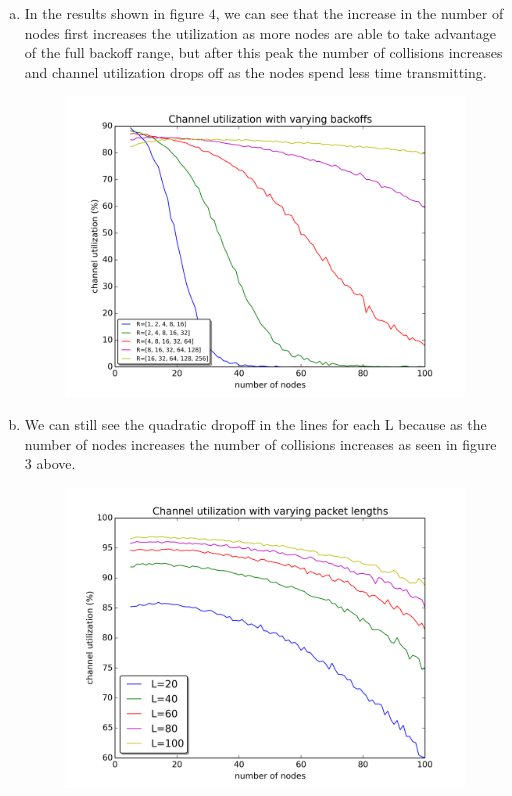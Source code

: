 \documentclass[11pt]{article}
\begin{document}
\begin{enumerate}[a.]
\newpage

\item In the results shown in figure $4$, we can see that the increase in the number of nodes first increases the utilization as more nodes are able to take advantage of the full backoff range, but after this peak the number of collisions increases and channel utilization drops off as the nodes spend less time transmitting.

\begin{figure}[H]
\centering
\includegraphics[width=.9\textwidth]{partD.png}
\caption{}
\end{figure}

\newpage

\item We can still see the quadratic dropoff in the lines for each L because as the number of nodes increases the number of collisions increases as seen in figure 3 above. 

\begin{figure}[H]
\centering
\includegraphics[width=.9\textwidth]{partE.png}
\caption{}
\end{figure}


\end{enumerate}
\end{document}
